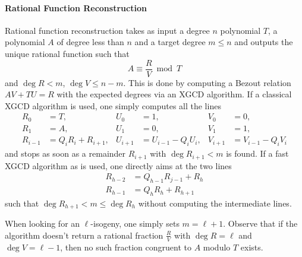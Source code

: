 \paragraph{Rational Function Reconstruction}
Rational function reconstruction takes as input a degree $n$
polynomial $T$, a polynomial $A$ of degree less than $n$ and a target
degree $m\le n$ and outputs the unique rational function such that
\begin{equation*}
  A \equiv \frac{R}{V} \bmod T
\end{equation*}
and $\deg R < m$, $\deg V \le n-m$. This is done by computing a Bezout
relation $AV + TU = R$ with the expected degrees via an XGCD
algorithm. If a classical XGCD algorithm is used, one simply computes
all the lines
\begin{equation}
  \label{eq:XGCD}
  \begin{aligned}
    R_0 &= T, & U_0 &= 1, & V_0 &= 0,\\
    R_1 &= A, & U_1 &= 0, & V_1 &= 1,\\
    R_{i-1} &= Q_iR_i + R_{i+1}, & U_{i+1} &= U_{i-1}-Q_iU_i, & V_{i+1} &= V_{i-1}-Q_iV_i
  \end{aligned}
\end{equation}
and stops as soon as a remainder $R_{i+1}$ with $\deg R_{i+1}<m$ is
found. If a fast XGCD algorithm as \cite[Algo. 11.4]{vzGG} is used,
one directly aims at the two lines
\begin{equation}
  \label{eq:FastGCD}
  \begin{aligned}
    R_{h-2} &= Q_{h-1}R_{j-1} + R_h\\
    R_{h-1} &= Q_hR_h + R_{h+1}
  \end{aligned}
\end{equation}
such that $\deg R_{h+1} < m \le \deg R_h$ without computing the
intermediate lines.

When looking for an $\ell$-isogeny, one simply sets
$m=\ell+1$. Observe that if the algorithm doesn't return a rational
fraction $\frac{R}{V}$ with $\deg R = \ell$ and $\deg V = \ell -1 $,
then no such fraction congruent to $A$ modulo $T$ exists.

